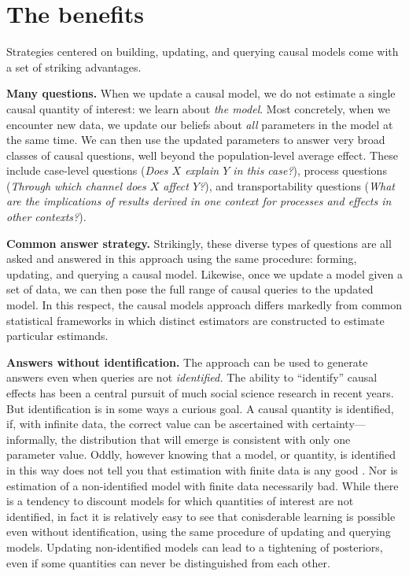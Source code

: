 \documentclass[
  12pt,
]{book}
\begin{document}
\hypertarget{the-benefits}{%
\section{The benefits}\label{the-benefits}}

Strategies centered on building, updating, and querying causal models come with a set of striking advantages.

\textbf{Many questions.} When we update a causal model, we do not estimate a single causal quantity of interest: we learn about \emph{the model}. Most concretely, when we encounter new data, we update our beliefs about \emph{all} parameters in the model at the same time. We can then use the updated parameters to answer very broad classes of causal questions, well beyond the population-level average effect. These include case-level questions (\emph{Does \(X\) explain \(Y\) in this case?}), process questions (\emph{Through which channel does \(X\) affect \(Y\)?}), and transportability questions (\emph{What are the implications of results derived in one context for processes and effects in other contexts?}).

\textbf{Common answer strategy.} Strikingly, these diverse types of questions are all asked and answered in this approach using the same procedure: forming, updating, and querying a causal model. Likewise, once we update a model given a set of data, we can then pose the full range of causal queries to the updated model. In this respect, the causal models approach differs markedly from common statistical frameworks in which distinct estimators are constructed to estimate particular estimands.

\textbf{Answers without identification.} The approach can be used to generate answers even when queries are not \emph{identified.} The ability to ``identify'' causal effects has been a central pursuit of much social science research in recent years. But identification is in some ways a curious goal. A causal quantity is identified, if, with infinite data, the correct value can be ascertained with certainty---informally, the distribution that will emerge is consistent with only one parameter value. Oddly, however knowing that a model, or quantity, is identified in this way does not tell you that estimation with finite data is any good \citep{maclaren2019can}. Nor is estimation of a non-identified model with finite data necessarily bad. While there is a tendency to discount models for which quantities of interest are not identified, in fact it is relatively easy to see that conisderable learning is possible even without identification, using the same procedure of updating and querying models. Updating non-identified models can lead to a tightening of posteriors, even if some quantities can never be distinguished from each other.
\end{document}
